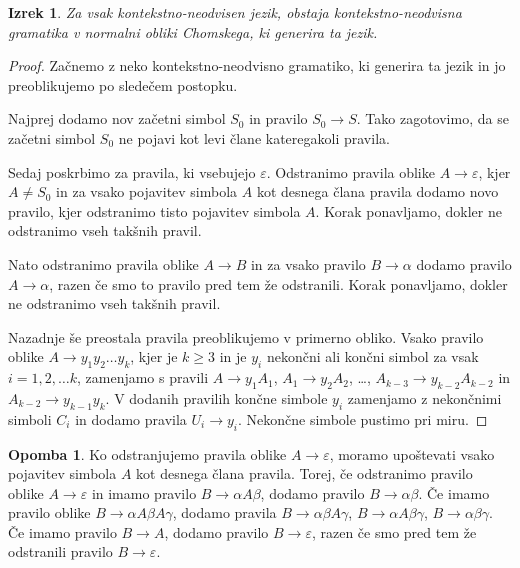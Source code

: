 \documentclass{amsart}
\theoremstyle{definition}
\newtheorem{opomba}[definicija]{Opomba}
\theoremstyle{plain} %
\newtheorem{izrek}[definicija]{Izrek}
\begin{document}
\begin{izrek}

    Za vsak kontekstno-neodvisen jezik, obstaja kontekstno-neodvisna gramatika v normalni obliki Chomskega, ki
    generira ta jezik.

\end{izrek}

\begin{proof}
    Začnemo z neko kontekstno-neodvisno gramatiko, ki generira ta jezik in jo preoblikujemo po sledečem
    postopku.

    Najprej dodamo nov začetni simbol $ S_0 $ in pravilo $ S_0 \rightarrow S $.
    Tako zagotovimo, da se začetni simbol $ S_0 $ ne pojavi kot levi člane kateregakoli
    pravila.

    Sedaj poskrbimo za pravila, ki vsebujejo $ \varepsilon $. Odstranimo pravila oblike $ A \rightarrow
    \varepsilon $, kjer $ A \neq S_0 $ in za vsako pojavitev simbola $A$ kot desnega člana pravila dodamo
    novo pravilo, kjer odstranimo tisto pojavitev simbola $A$. Korak ponavljamo, dokler ne odstranimo vseh
    takšnih pravil.

    Nato odstranimo pravila oblike $ A \rightarrow B $ in za vsako pravilo $ B \rightarrow \alpha $ dodamo 
    pravilo $ A \rightarrow \alpha $, razen če smo to pravilo pred tem že odstranili. Korak ponavljamo,
    dokler ne odstranimo vseh takšnih pravil.

    Nazadnje še preostala pravila preoblikujemo v primerno obliko. Vsako pravilo oblike
    $ A \rightarrow y_1 y_2 \dots y_k $, kjer je $ k \geq 3 $ in je $y_i$
    nekončni ali končni simbol za vsak $ i = 1, 2, \ldots k $, zamenjamo s pravili
    $ A \rightarrow y_1 A_1 $, $ A_1 \rightarrow y_2 A_2 $, \ldots,
    $ A_{k-3} \rightarrow y_{k-2} A_{k-2} $ in $ A_{k-2} \rightarrow y_{k-1} y_{k} $.
    V dodanih pravilih končne simbole $y_i$ zamenjamo z nekončnimi simboli $C_i$ in dodamo
    pravila $ U_i \rightarrow y_i $. Nekončne simbole pustimo pri miru.
\end{proof}

\begin{opomba}
    
    Ko odstranjujemo pravila oblike $ A \rightarrow \varepsilon $, moramo upoštevati vsako pojavitev
    simbola $ A $ kot desnega člana pravila. Torej, če odstranimo pravilo oblike $ A \rightarrow \varepsilon $
    in imamo pravilo $ B \rightarrow \alpha A \beta $, dodamo pravilo $ B \rightarrow \alpha \beta $.
    Če imamo pravilo oblike $ B \rightarrow \alpha A \beta A \gamma $, dodamo pravila 
    $ B \rightarrow \alpha \beta A \gamma $, $ B \rightarrow \alpha A \beta \gamma $,
    $ B \rightarrow \alpha \beta \gamma $. Če imamo pravilo $ B \rightarrow A $, dodamo 
    pravilo $ B \rightarrow \varepsilon $, razen če smo pred tem že odstranili pravilo
    $ B \rightarrow \varepsilon $.

\end{opomba}
\end{document}
